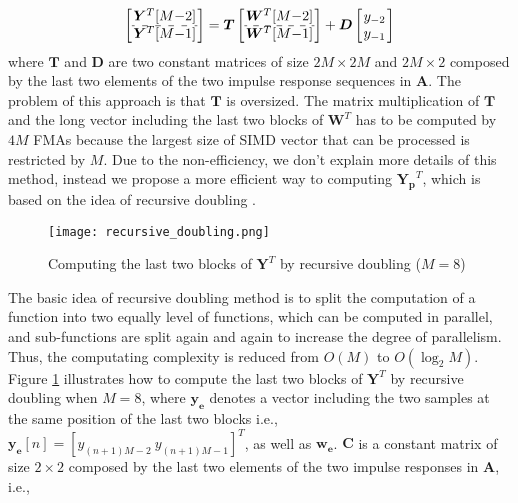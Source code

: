 \begin{equation*}
    \begin{aligned}
        \left[\arraycolsep=1.0pt\def\arraystretch{1.0}
                \begin{array}{c}
                \bm{Y}^T[M{-}2] \\  \hdashline
                \bm{Y}^T[M{-}1] \\ 
                \end{array}\right] = \bm{T} \left[\arraycolsep=1.0pt\def\arraystretch{1.0}
                \begin{array}{c}
                \bm{W}^T[M{-}2] \\  \hdashline
                \bm{W}^T[M{-}1] \\ 
                \end{array}\right] + \bm{D} \left[\arraycolsep=1.0pt\def\arraystretch{1.0}
                \begin{array}{c}
                y_{-2} \\  
                y_{-1} \\ 
                \end{array}\right] \\
    \end{aligned}
\end{equation*}
where $\bm{T}$ and $\bm{D}$ are two constant matrices of size $2M \times 2M$ and $2M \times 2$
composed by the last two elements of the two impulse response sequences in $\bm{A}$.
The problem of this approach is that $\bm{T}$ is oversized.
The matrix multiplication of $\bm{T}$ and the long vector including the last two blocks of $\bm{W}^T$ 
has to be computed by $4M$ FMAs because
the largest size of SIMD vector that can be processed is restricted by $M$.
Due to the non-efficiency, we don't explain more details of this method,
instead we propose a more efficient way to computing 
$\bm{Y_p}^T$, which is based on the idea of recursive doubling \cite{Kogge_73}.

\begin{figure}[t]
    \centerline{\texttt{[image: recursive\_doubling.png]}}
    \caption{Computing the last two blocks of $\bm{Y}^T$ by recursive doubling ($M=8$)}
    \label{fig:Recursive_doubling}
  \end{figure}

The basic idea of recursive doubling method is to split the computation of a function into two equally level of functions,
which can be computed in parallel, and sub-functions are split again and again to increase the degree of parallelism.
Thus, the computating complexity is reduced from $O(M)$ to $O(\log_2M)$.
Figure \ref{fig:Recursive_doubling} illustrates how to compute the last two blocks of $\bm{Y}^T$ by 
recursive doubling when $M=8$, where $\bm{y_e}$ denotes a vector including the two samples at the same position 
of the last two blocks
i.e., $\bm{y_e}[n] = \left[y_{(n+1)M-2} ~ y_{(n+1)M-1}\right]^T$, as well as $\bm{w_e}$.
$\bm{C}$ is a constant matrix
of size $2 \times 2$ composed by the last two elements of the two impulse responses in $\bm{A}$, i.e.,

